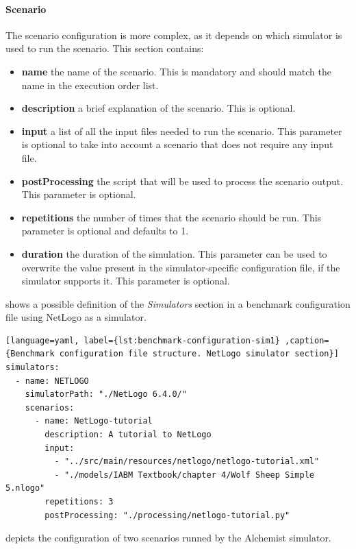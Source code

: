 \documentclass[12pt,a4paper,openright,twoside]{book}
\begin{document}
\paragraph*{Scenario}
The scenario configuration is more complex, as it depends on which simulator is used to run the scenario.
This section contains:
\begin{itemize}
  \item \textbf{name} the name of the scenario. This is mandatory and should match the name in the execution order list.
  \item \textbf{description} a brief explanation of the scenario. This is optional.
  \item \textbf{input} a list of all the input files needed to run the scenario. This parameter is optional to take into account a scenario that does not require any input file.
  \item \textbf{postProcessing} the script that will be used to process the scenario output. This parameter is optional.
  \item \textbf{repetitions} the number of times that the scenario should be run. This parameter is optional and defaults to 1.
  \item \textbf{duration} the duration of the simulation. This parameter can be used to overwrite the value present in the simulator-specific configuration file, if the simulator supports it. This parameter is optional.
\end{itemize}

 shows a possible definition of the \emph{Simulators} section in a benchmark configuration file using NetLogo as a simulator.

\begin{lstlisting}[language=yaml, label={lst:benchmark-configuration-sim1} ,caption={Benchmark configuration file structure. NetLogo simulator section}]
simulators:
  - name: NETLOGO
    simulatorPath: "./NetLogo 6.4.0/"
    scenarios:
      - name: NetLogo-tutorial
        description: A tutorial to NetLogo
        input:
          - "../src/main/resources/netlogo/netlogo-tutorial.xml"
          - "./models/IABM Textbook/chapter 4/Wolf Sheep Simple 5.nlogo"
        repetitions: 3
        postProcessing: "./processing/netlogo-tutorial.py"
\end{lstlisting}

 depicts the configuration of two scenarios runned by the Alchemist simulator.
\end{document}
